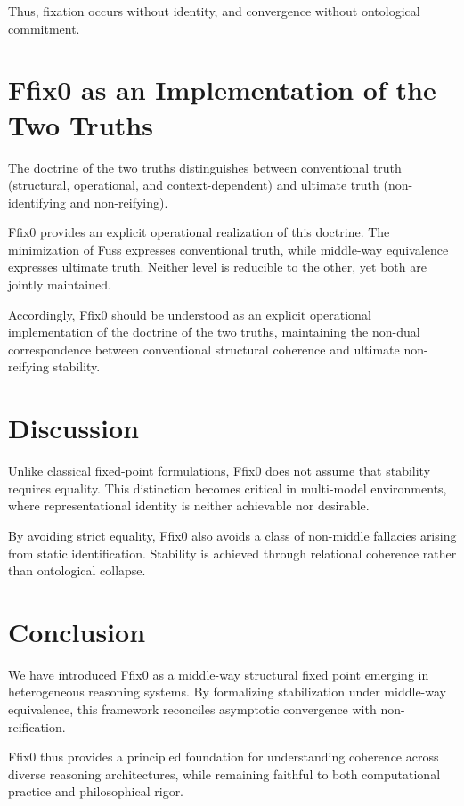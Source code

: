 \documentclass[11pt]{article}
\theoremstyle{definition}
\begin{document}
Thus, fixation occurs without identity, and convergence without
ontological commitment.

\section{Ffix0 as an Implementation of the Two Truths}

The doctrine of the two truths distinguishes between conventional truth
(structural, operational, and context-dependent)
and ultimate truth (non-identifying and non-reifying).

Ffix0 provides an explicit operational realization of this doctrine.
The minimization of Fuss expresses conventional truth,
while middle-way equivalence expresses ultimate truth.
Neither level is reducible to the other, yet both are jointly maintained.

Accordingly, Ffix0 should be understood as an explicit operational
implementation of the doctrine of the two truths, maintaining the
non-dual correspondence between conventional structural coherence
and ultimate non-reifying stability.

\section{Discussion}

Unlike classical fixed-point formulations, Ffix0 does not assume that
stability requires equality.
This distinction becomes critical in multi-model environments,
where representational identity is neither achievable nor desirable.

By avoiding strict equality, Ffix0 also avoids a class of non-middle
fallacies arising from static identification.
Stability is achieved through relational coherence rather than
ontological collapse.

\section{Conclusion}

We have introduced Ffix0 as a middle-way structural fixed point
emerging in heterogeneous reasoning systems.
By formalizing stabilization under middle-way equivalence,
this framework reconciles asymptotic convergence with non-reification.

Ffix0 thus provides a principled foundation for understanding coherence
across diverse reasoning architectures, while remaining faithful to
both computational practice and philosophical rigor.
\end{document}
